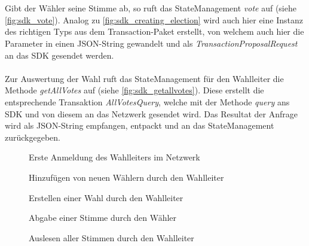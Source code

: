 \documentclass[parskip=full]{scrartcl}
\begin{document}
	\\ \\
	Gibt der Wähler seine Stimme ab, so ruft das StateManagement \textit{vote} auf (siehe \autoref{fig:sdk_vote}). Analog zu \autoref{fig:sdk_creating_election} wird auch hier eine Instanz des richtigen Typs aus dem Transaction-Paket erstellt, von welchem auch hier die Parameter in einen JSON-String gewandelt und als \textit{TransactionProposalRequest} an das SDK gesendet werden.
	\\ \\	
	Zur Auswertung der Wahl ruft das StateManagement für den Wahlleiter die Methode \textit{getAllVotes} auf (siehe \autoref{fig:sdk_getallvotes}). Diese erstellt die entsprechende Transaktion \textit{AllVotesQuery},
	welche mit der Methode \textit{query} ans SDK und von diesem an das Netzwerk gesendet wird. Das Resultat der Anfrage wird als JSON-String empfangen, entpackt und an das StateManagement zurückgegeben. 
	\newpage
	\pagestyle{empty}
	\begin{figure}
		\centering
		\hspace{-100pt}
		\centerline{}
		\caption{Erste Anmeldung des Wahlleiters im Netzwerk}
		\label{fig:sdk_first_registration}
	\end{figure}
	\newpage
	\begin{figure}
		\centering
		\hspace{-100pt}
		\centerline{}
		\caption{Hinzufügen von neuen Wählern durch den Wahlleiter}
		\label{fig:sdk_adding_voters}
	\end{figure}
	\newpage
	\begin{figure}
		\centering
		\hspace{-100pt}
		\centerline{}
		\caption{Erstellen einer Wahl durch den Wahlleiter}
		\label{fig:sdk_creating_election}
	\end{figure}
	\newpage
	\begin{figure}
		\centering
		\hspace{-100pt}
		\centerline{}
		\caption{Abgabe einer Stimme durch den Wähler}
		\label{fig:sdk_vote}
	\end{figure}
	\newpage
	\begin{figure}
		\centering
		\hspace{-100pt}
		\centerline{}
		\caption{Auslesen aller Stimmen durch den Wahlleiter}
		\label{fig:sdk_getallvotes}
	\end{figure}
	\newpage
\end{document}
